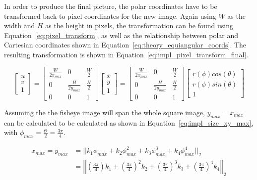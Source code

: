 In order to produce the final picture, the polar coordinates have to be transformed back to pixel coordinates for the new image. Again using $W$ as the width and $H$ as the height in pixels, the transformation can be found using Equation~\eqref{eq:pixel_transform}, as well as the relationship between polar and Cartesian coordinates shown in Equation~\eqref{eq:theory_equiangular_coords}. The resulting transformation is shown in Equation~\eqref{eq:impl_pixel_transform_final}.

\begin{equation}
    \begin{bmatrix}
        u \\ v \\ 1
    \end{bmatrix} = \begin{bmatrix}
        \frac{W}{2x_{max}} & 0 & \frac{W}{2} \\
        0 & \frac{H}{2y_{max}} & \frac{H}{2} \\
        0 & 0 & 1
    \end{bmatrix}\begin{bmatrix}
        x \\ y \\ 1
    \end{bmatrix} =
    \begin{bmatrix}
        \frac{W}{2x_{max}} & 0 & \frac{W}{2} \\
        0 & \frac{H}{2y_{max}} & \frac{H}{2} \\
        0 & 0 & 1
    \end{bmatrix}\begin{bmatrix}
        r(\phi) cos(\theta) \\ r(\phi) sin(\theta) \\ 1
    \end{bmatrix}
    \label{eq:impl_pixel_transform_final}
\end{equation}

Assuming the the fisheye image will span the whole square image, $y_{max} = x_{max}$ can be calculated to be calculated as shown in Equation~\eqref{eq:impl_size_xy_max}, with $\phi_{max}=\frac{\Theta}{2}=\frac{3 \pi}{4}$.

\begin{equation}
    \begin{aligned}
        x_{max} = y_{max} &= ||k_1 \phi_{max} + k_2 \phi_{max}^2 + k_3 \phi_{max}^3 + k_4 \phi_{max}^4 ||_2 \\
        &= \left|\left| \left(\frac{3 \pi}{4}\right)k_1 + \left(\frac{3 \pi}{4}\right)^2 k_2 + \left(\frac{3 \pi}{4}\right)^3 k_3 + \left(\frac{3 \pi}{4}\right)^4 k_4 \right|\right|_2
    \end{aligned}
    \label{eq:impl_size_xy_max}
\end{equation}

